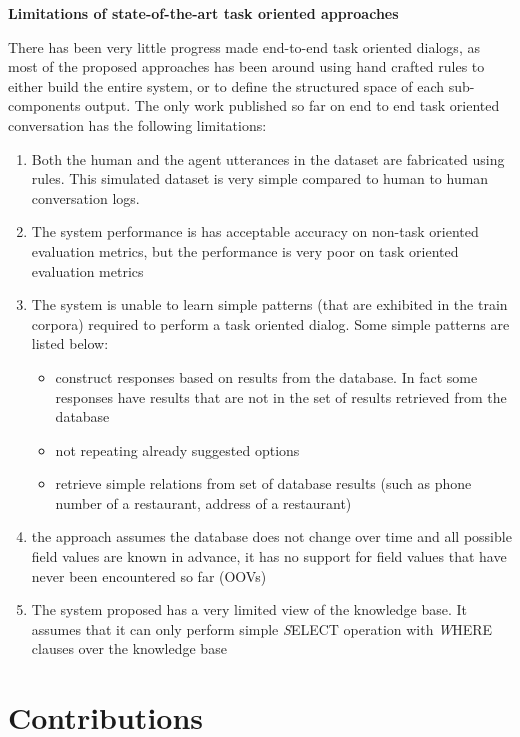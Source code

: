\noindent
\textbf{Limitations of state-of-the-art task oriented approaches}

There has been very little progress made end-to-end task oriented dialogs, as most of the proposed approaches has been around using hand crafted rules to either build the entire system, or to define the structured space of each sub-components output. The only work published so far on end to end task oriented conversation has the following limitations:
\begin{enumerate}
\item Both the human and the agent utterances in the dataset are fabricated using rules. This simulated dataset is very simple compared to human to human conversation logs.
\item The system performance is has acceptable accuracy on  non-task oriented evaluation metrics, but the performance is very poor on task oriented evaluation metrics
\item The system is unable to learn simple patterns (that are exhibited in the train corpora) required to perform a task oriented dialog. Some simple patterns are listed below:
\begin{itemize}
\item construct responses based on results from the database. In fact some responses have results that are not in the set of results retrieved from the database
\item not repeating already suggested options
\item retrieve simple relations from set of database results (such as phone number of a restaurant, address of a restaurant)
\end{itemize}  
\item the approach assumes the database does not change over time and all possible field values are known in advance, it has no support for field values that have never been encountered so far (OOVs)
\item The system proposed has a very limited view of the knowledge base. It assumes that it can only perform simple {\emph SELECT} operation with {\emph WHERE} clauses over the knowledge base
\end{enumerate} 

\section{Contributions}

